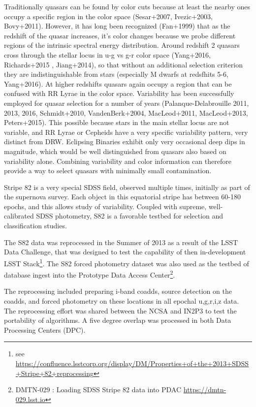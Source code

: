 \documentclass[fleqn,usenatbib]{mnras}  %
\begin{document}
Traditionally quasars can be found by color cuts because at least the nearby ones occupy a specific region in the color space (Sesar+2007, Ivezic+2003, Bovy+2011). However, it has long been recognized (Fan+1999) that as the redshift of the quasar increases, it's color changes because we probe different regions of the intrinsic spectral energy distribution. Around redshift 2 quasars cross through the stellar locus in u-g vs g-r color space (Yang+2016, Richards+2015 , Jiang+2014), so that without an additional selection criterion they are indistinguishable from stars (especially M dwarfs at redsfhits 5-6, Yang+2016). At higher redshifts quasars again occupy a region that can be confused with RR Lyrae in the color space. Variability has been successfully employed for quasar selection for a number of years (Palanque-Delabrouille 2011, 2013, 2016, Schmidt+2010, VandenBerk+2004, MacLeod+2011, MacLeod+2013, Peters+2015).  This possible because stars in the main stellar locus are not variable, and RR Lyrae or Cepheids have a very specific variability pattern, very distinct from DRW. Eclipsing Binaries exhibit only very occasional deep dips in magnitude, which would be well distinguished from quasars also based on variability alone.   Combining variability and color information can therefore provide a way to select quasars with minimally small contamination. 

Stripe 82 is a very special SDSS field, observed multiple times, initially as part of the supernova survey.  Each object in this equatorial stripe has between 60-180 epochs, and this allows study of variability. Coupled with supreme, well-calibrated SDSS photometry,  S82 is a favorable testbed for selection and classification studies. 

The S82 data was reprocessed in the Summer of 2013 as a result of the LSST Data Challenge, that was designed to test the capability of then in-development LSST Stack\footnote{see \url{https://confluence.lsstcorp.org/display/DM/Properties+of+the+2013+SDSS+Stripe+82+reprocessing}}. The S82 forced photometry dataset was also used as the testbed of database ingest into the Prototype Data Access Center\footnote{DMTN-029  : Loading SDSS Stripe 82 data into PDAC \url{https://dmtn-029.lsst.io}}.   

The reprocessing included preparing i-band coadds, source detection on the coadds, and forced photometry on these locations in all epochal u,g,r,i,z data. The reprocessing effort was shared between the NCSA and IN2P3 to test the portability of algorithms. A five degree overlap was processed in both Data Processing Centers (DPC). 
\end{document}
